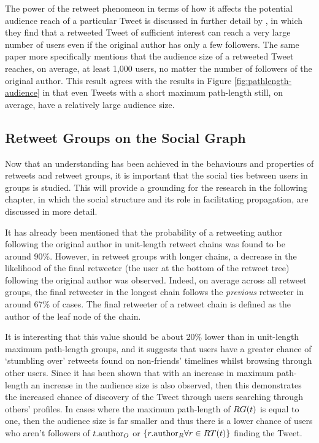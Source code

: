 The power of the retweet phenomeon in terms of how it affects the potential audience reach of a particular Tweet is discussed in further detail by \citet{kwak10}, in which they find that a retweeted Tweet of sufficient interest can reach a very large number of users even if the original author has only a few followers. The same paper more specifically mentions that the audience size of a retweeted Tweet reaches, on average, at least 1,000 users, no matter the number of followers of the original author. This result agrees with the results in Figure \ref{fig:pathlength-audience} in that even Tweets with a short maximum path-length still, on average, have a relatively large audience size.


\subsection{Retweet Groups on the Social Graph}
\label{section:retweets_graph}
Now that an understanding has been achieved in the behaviours and properties of retweets and retweet groups, it is important that the social ties between users in groups is studied. This will provide a grounding for the research in the following chapter, in which the social structure and its role in facilitating propagation, are discussed in more detail.

It has already been mentioned that the probability of a retweeting author following the original author in unit-length retweet chains was found to be around 90\%. However, in retweet groups with longer chains, a decrease in the likelihood of the final retweeter (the user at the bottom of the retweet tree) following the original author was observed. Indeed, on average across all retweet groups, the final retweeter in the longest chain follows the \textit{previous} retweeter in around 67\% of cases. The final retweeter of a retweet chain is defined as the author of the leaf node of the chain.


It is interesting that this value should be about 20\% lower than in unit-length maximum path-length groups, and it suggests that users have a greater chance of `stumbling over' retweets found on non-friends' timelines whilst browsing through other users. Since it has been shown that with an increase in maximum path-length an increase in the audience size is also observed, then this demonstrates the increased chance of discovery of the Tweet through users searching through others' profiles. In cases where the maximum path-length of $RG(t)$ is equal to one, then the audience size is far smaller and thus there is a lower chance of users who aren't followers of $t.\textrm{author}_O$ or $\left\{r.\textrm{author}_R \forall r \in RT(t)\right\}$ finding the Tweet.

